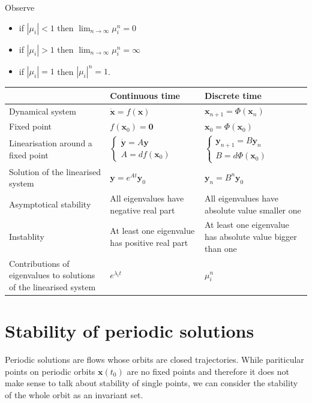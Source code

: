 \documentclass[hidelinks,a4paper, 11pt]{article}
\theoremstyle{plain}
\theoremstyle{break}
\theoremstyle{plain}
\theoremstyle{definition}
\begin{document}
Observe
\begin{itemize}
	\item if $|\mu_i| < 1$ then $\lim_{n \to \infty}\mu_i^n = 0$
	\item if $|\mu_i| > 1$ then $\lim_{n \to \infty}\mu_i^n = \infty$
	\item if $|\mu_i| = 1$ then $|\mu_i|^n = 1$.
\end{itemize}

{\def\arraystretch{2}\tabcolsep=6pt

\begin{tabular}{m{4cm}|m{4cm}|m{4cm}}
	& Continuous time & Discrete time \\ \hline
	Dynamical system &        $\mathbf{\dot x} = f(\mathbf x)$         &      $\mathbf x_{n+1} = \Phi(\mathbf x_n)$         \\
	Fixed point &    $f(\mathbf x_0) = \mathbf 0$             &     $\mathbf x_0 = \Phi(\mathbf x_0)$          \\
	Linearisation around a fixed point &      $\begin{cases}
		\mathbf{\dot y} = A \mathbf y \\ A = df(\mathbf x_0)
	\end{cases}$           &        $\begin{cases}
		\mathbf y_{n+1} = B \mathbf y_n \\ B = d\Phi(\mathbf x_0)
	\end{cases}$       \\
	Solution of the linearised system &      $\mathbf y = e^{At}\mathbf y_0$           &      $\mathbf y_n = B^n \mathbf y_0$         \\
	Asymptotical stability&       All eigenvalues have negative real part          &       All eigenvalues have absolute value smaller one        \\
	Instablity &      At least one eigenvalue has positive real part           &        At least one eigenvalue has absolute value bigger than one       \\
	Contributions of eigenvalues to solutions of the linearised system & $e^{\lambda_it}$& $\mu_i^n$
\end{tabular}



\section{Stability of periodic solutions}

Periodic solutions are flows whose orbits are closed trajectories. While pariticular points on periodic orbits $\mathbf x(t_0)$ are no fixed points and therefore it does not make sense to talk about stability of single points, we can consider the stability of the whole orbit as an invariant set.

}
\end{document}
